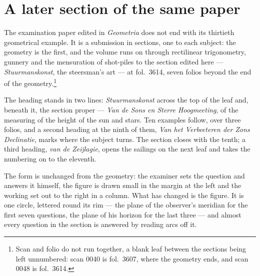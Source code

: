 \documentclass[11pt,twoside,openany]{book}
\begin{document}
\chapter*{A later section of the same paper}
The examination paper edited in \textit{Geometria} does not end with its thirtieth geometrical example. It is a submission in sections, one to each subject: the geometry is the first, and the volume runs on through rectilinear trigonometry, gunnery and the mensuration of shot-piles to the section edited here --- \textit{Stuurmanskonst}, the steersman's art --- at fol.~3614, seven folios beyond the end of the geometry.\footnote{Scan and folio do not run together, a blank leaf between the sections being left unnumbered: scan 0040 is fol.~3607, where the geometry ends, and scan 0048 is fol.~3614.}\par\vspace{8pt}
The heading stands in two lines: \textit{Stuurmanskonst} across the top of the leaf and, beneath it, the section proper --- \textit{Van de Sons en Sterre Hoogmeeting}, of the measuring of the height of the sun and stars. Ten examples follow, over three folios, and a second heading at the ninth of them, \textit{Van het Verbeeteren der Zons Declinatie}, marks where the subject turns. The section closes with the tenth; a third heading, \textit{van de Zeijlagie}, opens the sailings on the next leaf and takes the numbering on to the eleventh.\par\vspace{8pt}
The form is unchanged from the geometry: the examiner sets the question and answers it himself, the figure is drawn small in the margin at the left and the working set out to the right in a column. What has changed is the figure. It is one circle, lettered round its rim --- the plane of the observer's meridian for the first seven questions, the plane of his horizon for the last three --- and almost every question in the section is answered by reading arcs off it.
\end{document}
